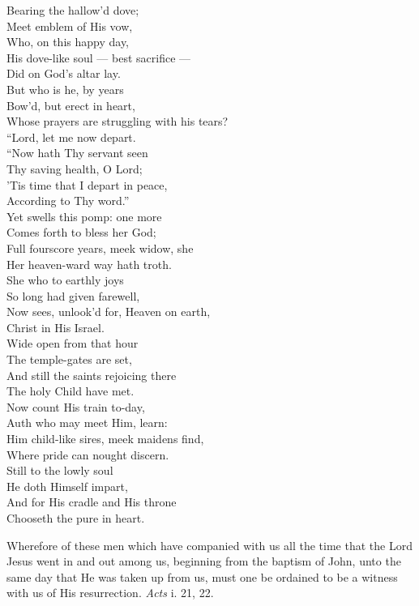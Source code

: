  Bearing the hallow’d dove; \\
  Meet emblem of His vow, \\
 Who, on this happy day, \\
 His dove-like soul — best sacrifice — \\
 Did on God’s altar lay. \\
  But who is he, by years \\
 Bow’d, but erect in heart, \\
 Whose prayers are struggling with his tears? \\
 “Lord, let me now depart. \\
  “Now hath Thy servant seen \\
 Thy saving health, O Lord; \\
 ’Tis time that I depart in peace, \\
 According to Thy word.” \\
  Yet swells this pomp: one more \\
 Comes forth to bless her God; \\
 Full fourscore years, meek widow, she \\
 Her heaven-ward way hath troth. \\
  She who to earthly joys \\
 So long had given farewell, \\
 Now sees, unlook’d for, Heaven on earth, \\
 Christ in His Israel. \\
  Wide open from that hour \\
 The temple-gates are set, \\
 And still the saints rejoicing there \\
 The holy Child have met. \\
  Now count His train to-day, \\
 Auth who may meet Him, learn: \\
 Him child-like sires, meek maidens find, \\
 Where pride can nought discern. \\
  Still to the lowly soul \\
 He doth Himself impart, \\
 And for His cradle and His throne \\
 Chooseth the pure in heart.\\


Wherefore of these men which have companied with us all the time that the Lord Jesus went in and out among us, beginning from the baptism of John, unto the same day that He was taken up from us, must one be ordained to be a witness with us of His resurrection. \emph{Acts} i. 21, 22.

